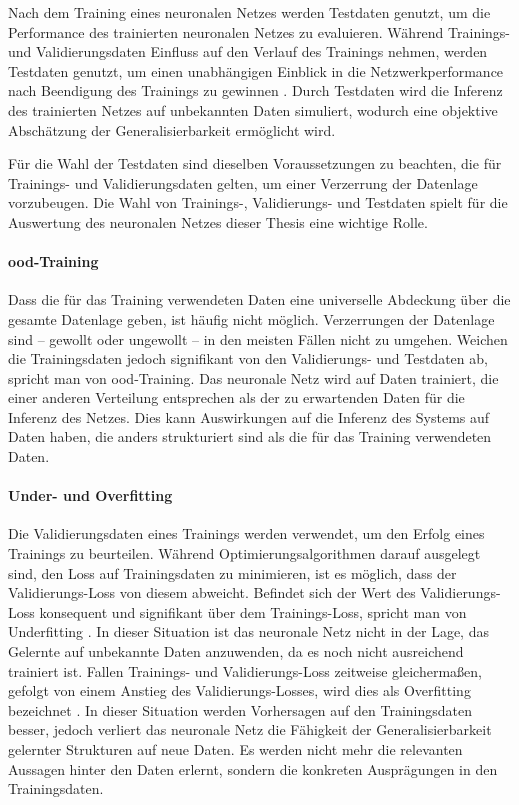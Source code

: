 Nach dem Training eines neuronalen Netzes werden Testdaten genutzt, um die Performance des trainierten neuronalen Netzes zu evaluieren. Während Trainings- und Validierungsdaten Einfluss auf den Verlauf des Trainings nehmen, werden Testdaten genutzt, um einen unabhängigen Einblick in die Netzwerkperformance nach Beendigung des Trainings zu gewinnen \cite{nn_terminology}. Durch Testdaten wird die Inferenz des trainierten Netzes auf unbekannten Daten simuliert, wodurch eine objektive Abschätzung der Generalisierbarkeit ermöglicht wird.

Für die Wahl der Testdaten sind dieselben Voraussetzungen zu beachten, die für Trainings- und Validierungsdaten gelten, um einer Verzerrung der Datenlage vorzubeugen. Die Wahl von Trainings-, Validierungs- und Testdaten spielt für die Auswertung des neuronalen Netzes dieser Thesis eine wichtige Rolle.

\paragraph{\Acl{ood}-Training}

Dass die für das Training verwendeten Daten eine universelle Abdeckung über die gesamte Datenlage geben, ist häufig nicht möglich. Verzerrungen der Datenlage sind -- gewollt oder ungewollt -- in den meisten Fällen nicht zu umgehen. Weichen die Trainingsdaten jedoch signifikant von den Validierungs- und Testdaten ab, spricht man von \Acf{ood}-Training. Das neuronale Netz wird auf Daten trainiert, die einer anderen Verteilung entsprechen als der zu erwartenden Daten für die Inferenz des Netzes. Dies kann Auswirkungen auf die Inferenz des Systems auf Daten haben, die anders strukturiert sind als die für das Training verwendeten Daten.

\paragraph{Under- und Overfitting}

Die Validierungsdaten eines Trainings werden verwendet, um den Erfolg eines Trainings zu beurteilen. Während Optimierungsalgorithmen darauf ausgelegt sind, den Loss auf Trainingsdaten zu minimieren, ist es möglich, dass der Validierungs-Loss von diesem abweicht. Befindet sich der Wert des Validierungs-Loss konsequent und signifikant über dem Trainings-Loss, spricht man von Underfitting \cite{nn_terminology,cv_general}. In dieser Situation ist das neuronale Netz nicht in der Lage, das Gelernte auf unbekannte Daten anzuwenden, da es noch nicht ausreichend trainiert ist. Fallen Trainings- und Validierungs-Loss zeitweise gleichermaßen, gefolgt von einem Anstieg des Validierungs-Losses, wird dies als Overfitting bezeichnet \cite{cv_general}. In dieser Situation werden Vorhersagen auf den Trainingsdaten besser, jedoch verliert das neuronale Netz die Fähigkeit der Generalisierbarkeit gelernter Strukturen auf neue Daten. Es werden nicht mehr die relevanten Aussagen hinter den Daten erlernt, sondern die konkreten Ausprägungen in den Trainingsdaten.

